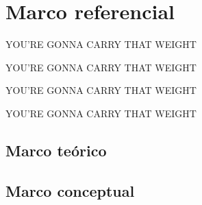 
\chapter{Marco referencial}

\lipsum[23-25]

\vfill

\begin{flushright}
	{\LARGE YOU'RE GONNA CARRY THAT WEIGHT}
\end{flushright}

\begin{flushright}
	{\myfont YOU'RE GONNA CARRY THAT WEIGHT}
\end{flushright}

\begin{flushright}
	{\Huge\myfont YOU'RE GONNA CARRY THAT WEIGHT}
\end{flushright}

\begin{flushright}
	{\Huge\myCBfont YOU'RE GONNA CARRY THAT WEIGHT}
\end{flushright}

\section{Marco teórico}

\lipsum[26-27]

\section{Marco conceptual}

\lipsum[28-29]

\newpage

